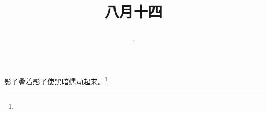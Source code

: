 \title{\date[d=16,m=9,y=2024][year:cn-y,年,month:cn,day:cn,日,·,weekday]·八月十四 }
影子叠着影子使黑暗蠕动起来。\footnote{ }

